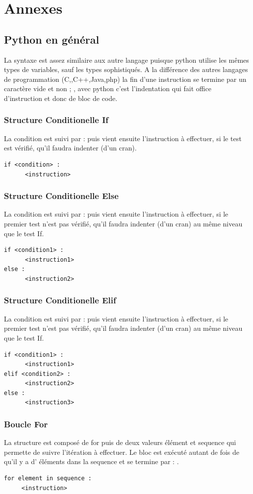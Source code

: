 \documentclass[a4paper, 12pt, twoside]{article}
\begin{document}
\newpage
\section{Annexes}
\subsection{Python en général}
La syntaxe est assez similaire aux autre langage puisque python utilise les mêmes types de variables, sauf les types sophistiqués. A la différence des autres langages de programmation (C,,C++,Java,php) la fin d'une instruction se termine par un caractère vide
et non  ; , avec python c'est l'indentation qui fait office d'instruction et donc de bloc de code.
\subsubsection{ Structure Conditionelle If }
La condition est suivi par  :  puis vient ensuite l'instruction à effectuer, si le test est vérifié, qu'il faudra indenter (d'un cran).
\begin{verbatim}
if <condition> :
      <instruction>
\end{verbatim}
\subsubsection{ Structure Conditionelle Else}
La condition est suivi par  :  puis vient ensuite l'instruction à effectuer, si le premier test n'est pas vérifié, qu'il faudra indenter (d'un cran) au même niveau que le test If.
\begin{verbatim}
if <condition1> :
      <instruction1>
else :
      <instruction2>
\end{verbatim}
\subsubsection{ Structure Conditionelle Elif }
La condition est suivi par  :  puis vient ensuite l'instruction à effectuer, si le premier test n'est pas vérifié, qu'il faudra indenter (d'un cran) au même niveau que le test If.
\begin{verbatim}
if <condition1> :
      <instruction1>
elif <condition2> :
      <instruction2>
else : 
      <instruction3>
\end{verbatim}
\subsubsection{ Boucle For}
La structure est composé de for puis de deux valeurs élément et sequence qui permette de suivre l'itération à effectuer. Le bloc est exécuté autant de fois de qu'il y a d' éléments dans la sequence et se termine par  : .
\begin{verbatim}
for element in sequence :
     <instruction>
\end{verbatim}
\end{document}
